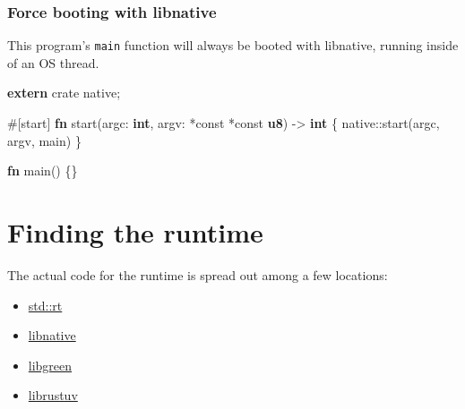 \documentclass[]{article}
\newenvironment{Shaded}{}{}
\newcommand{\KeywordTok}[1]{\textcolor[rgb]{0.00,0.44,0.13}{\textbf{{#1}}}}
\newcommand{\OtherTok}[1]{\textcolor[rgb]{0.00,0.44,0.13}{{#1}}}
\newcommand{\NormalTok}[1]{{#1}}
\begin{document}
\subsubsection{Force booting with
libnative}\label{force-booting-with-libnative}

This program's \texttt{main} function will always be booted with
libnative, running inside of an OS thread.

\begin{Shaded}
\begin{Highlighting}[]
\KeywordTok{extern} \NormalTok{crate native;}

\OtherTok{#[}\NormalTok{start}\OtherTok{]}
\KeywordTok{fn} \NormalTok{start(argc: }\KeywordTok{int}\NormalTok{, argv: *const *const }\KeywordTok{u8}\NormalTok{) -> }\KeywordTok{int} \NormalTok{\{}
    \NormalTok{native::start(argc, argv, main)}
\NormalTok{\}}

\KeywordTok{fn} \NormalTok{main() \{\}}
\end{Highlighting}
\end{Shaded}

\section{Finding the runtime}\label{finding-the-runtime}

The actual code for the runtime is spread out among a few locations:

\begin{itemize}
\itemsep1pt\parskip0pt
\item
  \href{std/rt/index.html}{std::rt}
\item
  \href{native/index.html}{libnative}
\item
  \href{green/index.html}{libgreen}
\item
  \href{rustuv/index.html}{librustuv}
\end{itemize}
\end{document}

